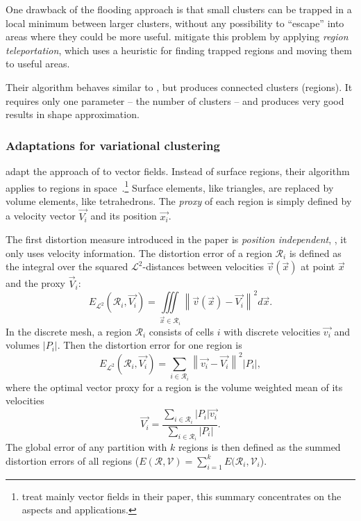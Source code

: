 One drawback of the flooding approach is that small clusters can be trapped in a local minimum between larger clusters, without any possibility to ``escape'' into areas where they could be more useful.  mitigate this problem by applying \emph{region teleportation}, which uses a heuristic for finding trapped regions and moving them to useful areas.

Their algorithm behaves similar to \kMeans, but produces co\-n\-nec\-t\-ed clusters (regions). It requires only one parameter -- the number of clusters -- and produces very good results in shape approximation.

\subsubsection{Adaptations for variational clustering}

 adapt the approach of  to vector fields. Instead of \twod surface regions, their algorithm applies to \threed regions in space~\cite{McKenzie}.\footnote{ treat mainly \twod vector fields in their paper, this summary concentrates on the \threed aspects and applications.} Surface elements, like triangles, are replaced by volume elements, like tetrahedrons. The \emph{proxy} of  each region is simply defined by a velocity vector $\vec{V_i}$ and its position $\vec{x_i}$.

The first distortion measure introduced in the paper is \emph{position independent}, \ie, it only uses velocity information. The distortion error of a region $\mathcal{R}_i$ is defined as the integral over the squared $\mathcal{L}^2$-distances between velocities $\vec{v}(\vec{x})$ at point $\vec{x}$ and the proxy $\vec{V}_i$:
%
\begin{equation}
  \label{eqn:related:McKenzieErrorInt}
  E_{\mathcal{L}^2}\left(\mathcal{R}_i, \vec{V_i}\right) = 
    \iiint\limits_{\vec{x}\in\mathcal{R}_i}{\left\|\vec{v}(\vec{x}) - 
    \vec{V_i}\right\|^2 d\vec{x}}.
\end{equation}
%
In the discrete mesh, a region $\mathcal{R}_i$ consists of cells $i$ with discrete velocities $\vec{v_i}$ and volumes $|P_i|$. Then the distortion error for one region is
%
\begin{equation}
  E_{\mathcal{L}^2}\left(\mathcal{R}_i, \vec{V_i}\right) = 
    \sum\limits_{i\in\mathcal{R}_i} {\left\|\vec{v_i} - \vec{V_i}\right\|^2 |P_i|},
  \label{eqn:related:McKenzieErrorSum}
\end{equation}
%
where the optimal vector proxy for a region is the volume weighted mean of its velocities
%
\begin{equation}
  \vec{V_i} = \frac{\sum\limits_{i\in\mathcal{R}_i}{|P_i|\vec{v_i}}} 
              {\sum\limits_{i\in\mathcal{R}_i}{|P_i|}}.
  \label{eqn:related:McKenzieAverage}
\end{equation}
%
The global error of any partition with $k$ regions is then defined as the summed distortion errors of all regions ($E(\mathcal{R}, \mathcal{V})=\sum_{i=1}^k {E(\mathcal{R}_i,\mathcal{V}_i}$).

